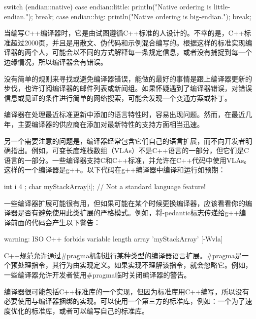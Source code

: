 \begin{cpp}
switch (endian::native)
{
    case endian::little:
        println("Native ordering is little-endian.");
        break;
    case endian::big:
        println("Native ordering is big-endian.");
        break;
}
\end{cpp}


当编写C++编译器时，它是由试图遵循C++标准的人设计的。不幸的是，C++标准超过2000页，并且是用散文、伪代码和示例混合编写的。根据这样的标准实现编译器的两个人，可能会以不同的方式解释每一条规定信息，或者没有捕捉到每一个边缘情况，所以编译器会有错误。


没有简单的规则来寻找或避免编译器错误，能做的最好的事情是跟上编译器更新的步伐，也许订阅编译器的邮件列表或新闻组。如果怀疑遇到了编译器错误，对错误信息或见证的条件进行简单的网络搜索，可能会发现一个变通方案或补丁。

编译器在处理最近标准更新中添加的语言特性时，容易出现问题。然而，在最近几年，主要编译器的供应商在添加对最新特性的支持方面相当迅速。

另一个需要注意的问题是，编译器经常包含它们自己的语言扩展，而不向开发者明确指出。例如，可变长度堆栈数组（VLAs）不是C++语言的一部分，但它们是C语言的一部分。一些编译器支持C和C++标准，并允许在C++代码中使用VLAs。这样的一个编译器是g++。以下代码在g++编译器中编译和运行如预期：

\begin{cpp}
int i { 4 };
char myStackArray[i]; // Not a standard language feature!
\end{cpp}

一些编译器扩展可能很有用，但如果可能在某个时候更换编译器，应该看看你的编译器是否有避免使用此类扩展的严格模式。例如，将-pedantic标志传递给g++编译前面的代码会产生以下警告：

\begin{shell}
warning: ISO C++ forbids variable length array 'myStackArray' [-Wvla]
\end{shell}

C++规范允许通过\#pragma机制进行某种类型的编译器语言扩展。\#pragma是一个预处理指令，其行为由实现定义。如果实现不理解该指令，就会忽略它。例如，一些编译器允许开发者使用\#pragma临时关闭编译器的警告。


编译器很可能包括C++标准库的一个实现，但因为标准库用C++编写，所以没有必要使用与编译器捆绑的实现。可以使用一个第三方的标准库，例如：一个为了速度优化的标准库，或者可以编写自己的标准库。

